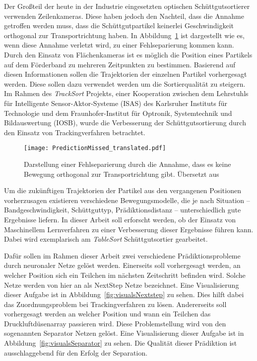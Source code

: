 
Der Großteil der heute in der Industrie eingesetzten optischen Schüttgutsortierer verwenden Zeilenkameras.
Diese haben jedoch den Nachteil, dass die Annahme getroffen werden muss, dass die Schüttgutpartikel keinerlei Geschwindigkeit orthogonal zur Transportrichtung haben.
In Abbildung~\ref{fig:predMissed} ist dargestellt wie es, wenn diese Annahme verletzt wird, zu einer Fehlseparierung kommen kann.
Durch den Einsatz von Flächenkameras ist es möglich die Position eines Partikels auf dem Förderband zu mehreren Zeitpunkten zu bestimmen.
Basierend auf diesen Informationen sollen die Trajektorien der einzelnen Partikel vorhergesagt werden.
Diese sollen dazu verwendet werden um die Sortierqualität zu steigern. 
Im Rahmen des \textit{TrackSort} Projekts, 
einer Kooperation zwischen dem Lehrstuhls für Intelligente Sensor-Aktor-Systeme (ISAS) des Karlsruher Instituts für Technologie
und dem Fraunhofer-Institut für Optronik, Systemtechnik und Bildauswertung (IOSB), 
wurde die Verbesserung der Schüttgutsortierung durch den Einsatz von Trackingverfahren betrachtet.

\begin{figure}[h]
    \centering
    \texttt{[image: PredictionMissed\_translated.pdf]}
    \caption{Darstellung einer Fehlseparierung durch die Annahme, dass es keine Bewegung orthogonal zur Transportrichtung gibt. 
    Übersetzt aus~\cite{Pfaff2018}}
    \label{fig:predMissed}
\end{figure}


Um die zukünftigen Trajektorien der Partikel aus den vergangenen Positionen vorherzusagen existieren verschiedene Bewegungsmodelle, 
die je nach Situation -- Bandgeschwindigkeit, Schüttguttyp, Prädiktionsdistanz -- unterschiedlich gute Ergebnisse liefern.  
In dieser Arbeit soll erforscht werden, ob der Einsatz von Maschinellem Lernverfahren zu einer Verbesserung dieser Ergebnisse führen kann.
Dabei wird exemplarisch am \textit{TableSort} Schüttgutsortier gearbeitet.

Dafür sollen im Rahmen dieser Arbeit zwei verschiedene Prädiktionsprobleme durch neuronaler Netze gelöst werden.
Einerseits soll vorhergesagt werden, an welcher Position sich ein Teilchen im nächsten Zeitschritt befinden wird.
Solche Netze werden von hier an als NextStep Netze bezeichnet.
Eine Visualisierung dieser Aufgabe ist in Abbildung~\ref{fig:visualsNextstep} zu sehen.
Dies hilft dabei das Zuordnungsproblem bei Trackingverfahren zu lösen.
Andererseits soll vorhergesagt werden an welcher Position und wann ein Teilchen das Druckluftdüsenarray passieren wird.
Diese Problemstellung wird von den sogenannten Separator Netzen gelöst.
Eine Visualisierung dieser Aufgabe ist in Abbildung~\ref{fig:visualsSeparator} zu sehen.
Die Qualität dieser Prädiktion ist ausschlaggebend für den Erfolg der Separation.


